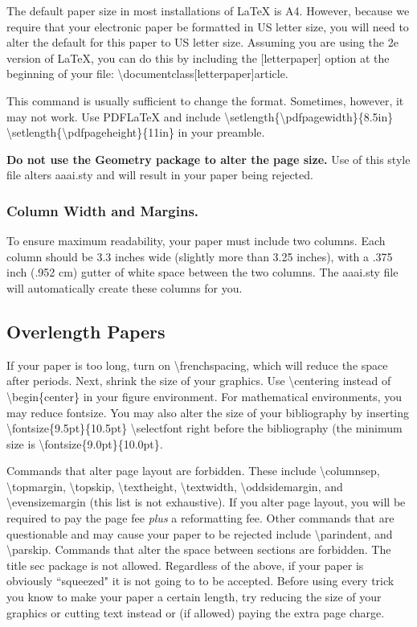 \documentclass[letterpaper]{article}
\begin{document}
The default paper size in most installations of \LaTeX{} is A4. However, because we require that your electronic paper be formatted in US letter size, you will need to alter the default for this paper to US letter size. Assuming you are using the 2e version of \LaTeX{}, you can do this by including the [letterpaper] option at the beginning of your file: 
\textbackslash documentclass[letterpaper]{article}. 

This command is usually sufficient to change the format. Sometimes, however, it may not work. Use PDF\LaTeX{} and include
\textbackslash setlength\{\textbackslash pdfpagewidth\}\{8.5in\}
\textbackslash setlength\{\textbackslash pdfpageheight\}\{11in\}
in your preamble. 

\textbf{Do not use the Geometry package to alter the page size.} Use of this style file alters aaai.sty and will result in your paper being rejected. 


\subsubsection{Column Width and Margins.}
To ensure maximum readability, your paper must include two columns. Each column should be 3.3 inches wide (slightly more than 3.25 inches), with a .375 inch (.952 cm) gutter of white space between the two columns. The aaai.sty file will automatically create these columns for you. 

\subsection{Overlength Papers}
If your paper is too long, turn on \textbackslash frenchspacing, which will reduce the space after periods. Next,  shrink the size of your graphics. Use \textbackslash centering instead of \textbackslash begin\{center\} in your figure environment. For mathematical environments, you may reduce fontsize. You may also alter the size of your bibliography by inserting \textbackslash fontsize\{9.5pt\}\{10.5pt\} \textbackslash selectfont
right before the bibliography (the minimum size is \textbackslash fontsize\{9.0pt\}\{10.0pt\}. 

Commands that alter page layout are forbidden. These include \textbackslash columnsep, \textbackslash topmargin, \textbackslash topskip, \textbackslash textheight, \textbackslash textwidth, \textbackslash oddsidemargin, and \textbackslash evensizemargin (this list is not exhaustive). If you alter page layout, you will be required to pay the page fee \textit{plus} a reformatting fee. Other commands that are questionable and may cause your paper to be rejected include  \textbackslash parindent, and \textbackslash parskip. Commands that alter the space between sections are forbidden. The title sec package is not allowed. Regardless of the above, if your paper is obviously ``squeezed" it is not going to to be accepted. Before using every trick you know to make your paper a certain length, try reducing the size of your graphics or cutting text instead or (if allowed) paying the extra page charge.
\end{document}
